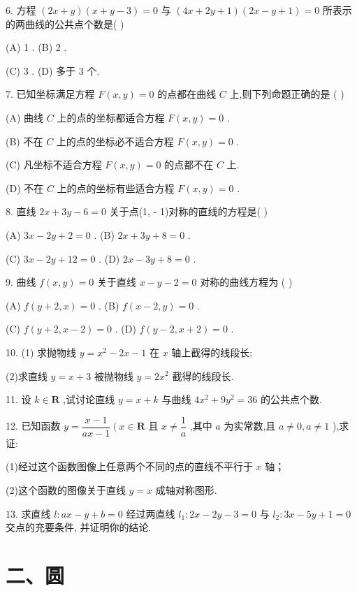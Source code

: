 6. 方程 $\left( {{2x} + y}\right) \left( {x + y - 3}\right)  = 0$ 与 $\left( {{4x} + {2y} + 1}\right) \left( {{2x} - y + 1}\right)  = 0$ 所表示的两曲线的公共点个数是(   )

(A) 1 . (B) 2 .

(C) 3 . (D) 多于 3 个.

7. 已知坐标满足方程 $F\left( {x,y}\right)  = 0$ 的点都在曲线 $C$ 上,则下列命题正确的是 (   )

(A) 曲线 $C$ 上的点的坐标都适合方程 $F\left( {x,y}\right)  = 0$ .

(B) 不在 $C$ 上的点的坐标必不适合方程 $F\left( {x,y}\right)  = 0$ .

(C) 凡坐标不适合方程 $F\left( {x,y}\right)  = 0$ 的点都不在 $C$ 上.

(D) 不在 $C$ 上的点的坐标有些适合方程 $F\left( {x,y}\right)  = 0$ .

8. 直线 ${2x} + {3y} - 6 = 0$ 关于点(1, - 1)对称的直线的方程是(   )

(A) ${3x} - {2y} + 2 = 0$ . (B) ${2x} + {3y} + 8 = 0$ .

(C) ${3x} - {2y} + {12} = 0$ . (D) ${2x} - {3y} + 8 = 0$ .

9. 曲线 $f\left( {x,y}\right)  = 0$ 关于直线 $x - y - 2 = 0$ 对称的曲线方程为 (   )

(A) $f\left( {y + 2,x}\right)  = 0$ . (B) $f\left( {x - 2,y}\right)  = 0$ .

(C) $f\left( {y + 2,x - 2}\right)  = 0$ . (D) $f\left( {y - 2,x + 2}\right)  = 0$ .

10. (1) 求抛物线 $y = {x}^{2} - {2x} - 1$ 在 $x$ 轴上截得的线段长;

(2)求直线 $y = x + 3$ 被抛物线 $y = 2{x}^{2}$ 截得的线段长.

11. 设 $k \in  \mathbf{R}$ ,试讨论直线 $y = x + k$ 与曲线 $4{x}^{2} + 9{y}^{2} = {36}$ 的公共点个数.

12. 已知函数 $y = \dfrac{x - 1}{{ax} - 1}\left( {x \in  \mathbf{R}}\right.$ 且 $x \neq  \dfrac{1}{a}$ ,其中 $a$ 为实常数,且 $a \neq  0,a \neq  1$ ),求证:

(1)经过这个函数图像上任意两个不同的点的直线不平行于 $x$ 轴；

(2)这个函数的图像关于直线 $y = x$ 成轴对称图形.

13. 求直线 $l : {ax} - y + b = 0$ 经过两直线 ${l}_{1} : {2x} - {2y} - 3 = 0$ 与 ${l}_{2} : {3x} - {5y} + 1 = 0$ 交点的充要条件, 并证明你的结论.

\section*{二、圆}

